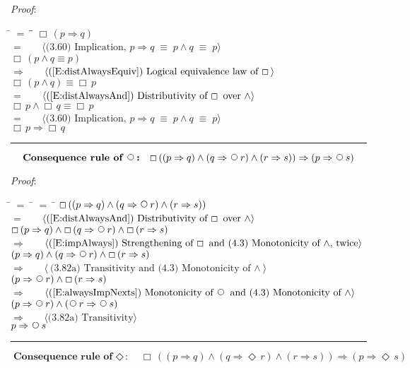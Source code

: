 \documentclass[12pt, fleqn, leqno]{article}
\newcommand{\lgap}{2pt}                             %
\newcommand{\mymathindent}{24pt}                    %
\newcommand{\equivs}{\ensuremath{\;\equiv\;}}       %
\newcommand{\impl}{\ensuremath{\Rightarrow}}        %
\newcommand{\Next}{\;\,\text{\raisebox{3.5pt}{\circle{6}}}}
\newcommand{\Event}{\Diamond\,}
\newcommand{\Always}{\Box\,}
\newcommand{\myqed}{\rule[-.23ex]{1.2ex}{2.0ex}}
\newcommand{\myqedtab}{\hspace{384pt}}              %
\newcommand{\Gll} {\langle}                         %
\newcommand{\Ggg} {\rangle}                         %
\newcommand{\Hint}[1]     {\ \ \ $\Gll              \mbox{#1} \Ggg$ }   %
\begin{document}
\emph{Proof}:
\begin{tabbing}
\hspace{\mymathindent} \= $= \;$ \= \myqedtab \= \kill
  \> \>   $\Always (p \impl q)$\\[\lgap]
  \> $=$  \>  \Hint{(3.60) Implication, $p\impl q \equivs p\land q \equivs p$}\\[\lgap]
  \> \>   $\Always (p \land q \equiv p)$\\[\lgap]
  \> $\impl$  \>  \Hint{(\ref{E:distAlwaysEquiv}) Logical equivalence law of $\Always$}\\[\lgap]
  \> \>   $\Always(p \land q) \equiv \Always p$\\[\lgap]
  \> $=$  \>  \Hint{(\ref{E:distAlwaysAnd}) Distributivity of $\Always$ over $\land$}\\[\lgap]
  \> \>   $\Always p \land \Always q \equiv \Always p$\\[\lgap]
  \> $=$  \>  \Hint{(3.60) Implication, $p\impl q \equivs p\land q \equivs p$}\\[\lgap]
  \> \>   $\Always p \impl \Always q$ \quad \myqed
\end{tabbing}
\begin{equation}\label{E:NextConRule}
\textbf{Consequence rule of $\Next$:}\quad \Always ( (p \impl q) \land (q \impl \Next r) \land (r \impl s)) \impl (p \impl \Next s)
\end{equation}

\emph{Proof}:
\begin{tabbing}
\hspace{\mymathindent} \= $= \;$ \= $= \;$ \= \kill
  \> \>   $\Always ( (p \impl q) \land (q \impl \Next r) \land (r \impl s))$\\[\lgap]
   \> $=$  \>  \Hint{(\ref{E:distAlwaysAnd}) Distributivity of $\Always$ over $\land$}\\[\lgap]
  \> \>   $\Always ( p \impl q) \land \Always (q \impl \Next r) \land \Always (r \impl s)$\\[\lgap]
   \> $\impl$  \>  \Hint{(\ref{E:impAlways}) Strengthening of $\Always$ and (4.3) Monotonicity of $\land$, twice}\\[\lgap]
    \> \>   $ (p \impl q) \land (q \impl \Next r) \land \Always (r \impl s)$\\[\lgap]
    \> $\impl$  \>  \Hint{(3.82a) Transitivity and (4.3) Monotonicity of $\land$}\\[\lgap]
     \> \>   $ (p \impl \Next r) \land \Always (r \impl s)$\\[\lgap]
     \> $\impl$ \> \Hint{(\ref{E:alwaysImpNexts}) Monotonicity of $\Next$ and (4.3) Monotonicity of $\land$} \\[\lgap]
  \> \>   $ (p \impl \Next r) \land (\Next r \impl \Next s)$\\[\lgap]
  \> $\impl$  \>  \Hint{(3.82a) Transitivity}\\[\lgap]
  \> \>   $ p \impl \Next s$\quad \myqed
\end{tabbing}
\begin{equation}\label{E:EventConRule}
\textbf{Consequence rule of $\Event$:}\quad \Always ( (p \impl q) \land (q \impl \Event r) \land (r \impl s)) \impl (p \impl \Event s)
\end{equation}
\end{document}
